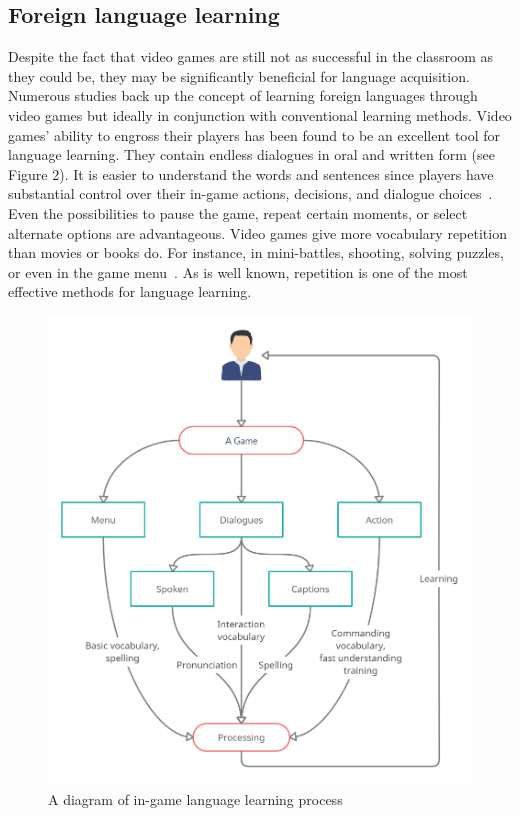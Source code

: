 \documentclass[10pt,twoside,english,a4paper]{article}
\begin{document}
\subsection{Foreign language learning}
Despite the fact that video games are still not as successful in the classroom as they could be, they may be significantly beneficial for language acquisition. Numerous studies back up the concept of learning foreign languages through video games but ideally in conjunction with conventional learning methods. Video games' ability to engross their players has been found to be an excellent tool for language learning. They contain endless dialogues in oral and written form (see Figure 2). It is easier to understand the words and sentences since players have substantial control over their in-game actions, decisions, and dialogue choices~\cite{language}. Even the possibilities to pause the game, repeat certain moments, or select alternate options are advantageous. Video games give more vocabulary repetition than movies or books do. For instance, in mini-battles, shooting, solving puzzles, or even in the game menu~\cite{language}. As is well known, repetition is one of the most effective methods for language learning.

\begin{figure}[h]
\centering
\includegraphics[scale=0.16]{language}
\caption{A diagram of in-game language learning process}
\end{figure}
\end{document}
